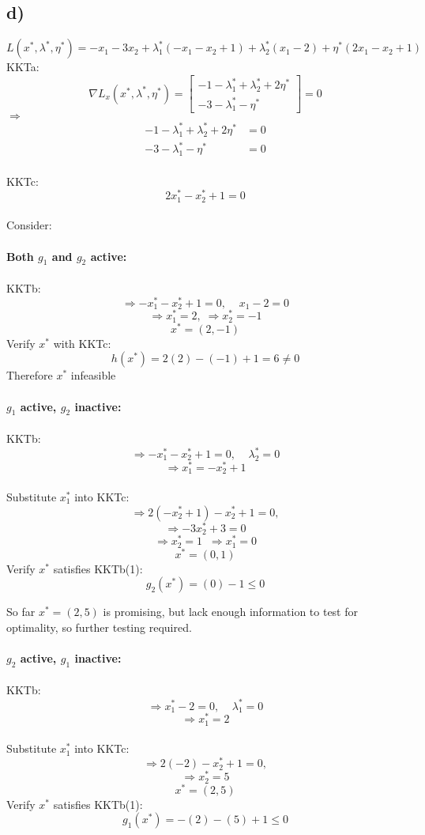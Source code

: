 \documentclass{article}
\begin{document}
\subsection*{d)}\label{ssec:name}
$$
L(x^*, \lambda^*, \eta^*) = -x_1-3x_2 + \lambda_1^*(-x_1-x_2+1) + \lambda_2^*(x_1-2) + \eta^*(2x_1-x_2+1)$$
KKTa:
$$\nabla L_x(x^*, \lambda^*, \eta^*) = 
\begin{bmatrix}
-1-\lambda_1^*+\lambda_2^*+2\eta^*\\
-3-\lambda_1^*-\eta^*
\end{bmatrix}
=0
$$
$\Rightarrow$
\begin{align}
-1-\lambda_1^*+\lambda_2^*+2\eta^*&=0\\
-3-\lambda_1^*-\eta^*&=0
\end{align}
\\
KKTc:
$$2x_1^*-x_2^*+1=0$$
\\
Consider:\\
\\
\hspace*{10mm}
\textbf{Both $g_1$ and $g_2$ active:}\\
\\
\hspace*{20mm}
KKTb:
$$\Rightarrow -x_1^*-x_2^*+1 = 0,\;\;\;\;x_1-2=0$$
$$\Rightarrow x_1^*=2,\;\Rightarrow x_2^*=-1$$
$$x^*=(2,-1)$$
\hspace*{20mm}
Verify $x^*$ with KKTc:
$$h(x^*)=2(2)-(-1)+1=6\neq0$$
\hspace*{20mm}
Therefore $x^*$ infeasible\\
\\
\hspace*{10mm}
\textbf{$g_1$ active, $g_2$ inactive:}\\
\\
\hspace*{20mm}
KKTb:
$$\Rightarrow -x_1^*-x_2^*+1 = 0,\;\;\;\;\lambda_2^*=0$$
$$\Rightarrow x_1^*=-x_2^*+1$$
\\
\hspace*{20mm}
Substitute $x_1^*$ into KKTc:
$$\Rightarrow 2(-x_2^*+1)-x_2^*+1=0,$$
$$\Rightarrow-3x_2^*+3=0$$
$$\Rightarrow x_2^*=1\;\;\Rightarrow x_1^*=0$$
$$x^*=(0,1)$$
\hspace*{20mm}
Verify $x^*$ satisfies KKTb(1):
$$g_2(x^*)=(0)-1\leq0$$

So far $x^*=(2,5)$ is promising, but lack enough information to test for optimality, so further testing required.\\
\\
\hspace*{10mm}
\textbf{$g_2$ active, $g_1$ inactive:}\\
\\
\hspace*{20mm}
KKTb:
$$\Rightarrow x_1^*-2= 0,\;\;\;\;\lambda_1^*=0$$
$$\Rightarrow x_1^*=2$$
\\
\hspace*{20mm}
Substitute $x_1^*$ into KKTc:
$$\Rightarrow 2(-2)-x_2^*+1=0,$$
$$\Rightarrow x_2^*=5$$
$$x^*=(2,5)$$
\hspace*{20mm}
Verify $x^*$ satisfies KKTb(1):
$$g_1(x^*)=-(2)-(5)+1\leq0$$
\end{document}
